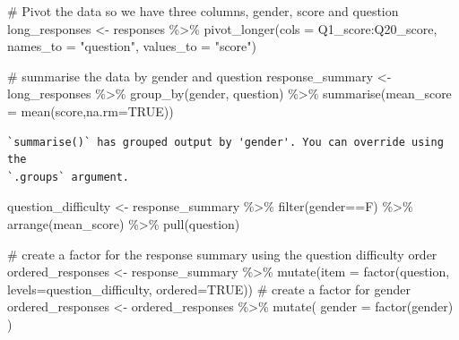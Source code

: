 \documentclass[
  letterpaper,
  DIV=11,
  numbers=noendperiod]{scrreprt}
\newenvironment{Shaded}{\begin{snugshade}}{\end{snugshade}}
\newcommand{\AttributeTok}[1]{\textcolor[rgb]{0.40,0.45,0.13}{#1}}
\newcommand{\CommentTok}[1]{\textcolor[rgb]{0.37,0.37,0.37}{#1}}
\newcommand{\ConstantTok}[1]{\textcolor[rgb]{0.56,0.35,0.01}{#1}}
\newcommand{\FunctionTok}[1]{\textcolor[rgb]{0.28,0.35,0.67}{#1}}
\newcommand{\NormalTok}[1]{\textcolor[rgb]{0.00,0.23,0.31}{#1}}
\newcommand{\OtherTok}[1]{\textcolor[rgb]{0.00,0.23,0.31}{#1}}
\newcommand{\SpecialCharTok}[1]{\textcolor[rgb]{0.37,0.37,0.37}{#1}}
\newcommand{\StringTok}[1]{\textcolor[rgb]{0.13,0.47,0.30}{#1}}
\begin{document}
\begin{Shaded}
\begin{Highlighting}[]
\CommentTok{\# Pivot the data so we have three columns, gender, score and question}
\NormalTok{long\_responses }\OtherTok{\textless{}{-}}\NormalTok{ responses }\SpecialCharTok{\%\textgreater{}\%} \FunctionTok{pivot\_longer}\NormalTok{(}\AttributeTok{cols =}\NormalTok{ Q1\_score}\SpecialCharTok{:}\NormalTok{Q20\_score, }\AttributeTok{names\_to =} \StringTok{"question"}\NormalTok{, }\AttributeTok{values\_to =} \StringTok{"score"}\NormalTok{)}
\end{Highlighting}
\end{Shaded}

\begin{Shaded}
\begin{Highlighting}[]
\CommentTok{\# summarise the data by gender and question}
\NormalTok{response\_summary }\OtherTok{\textless{}{-}}\NormalTok{ long\_responses }\SpecialCharTok{\%\textgreater{}\%} \FunctionTok{group\_by}\NormalTok{(gender, question) }\SpecialCharTok{\%\textgreater{}\%} \FunctionTok{summarise}\NormalTok{(}\AttributeTok{mean\_score =} \FunctionTok{mean}\NormalTok{(score,}\AttributeTok{na.rm=}\ConstantTok{TRUE}\NormalTok{))}
\end{Highlighting}
\end{Shaded}

\begin{verbatim}
`summarise()` has grouped output by 'gender'. You can override using the
`.groups` argument.
\end{verbatim}

\begin{Shaded}
\begin{Highlighting}[]
\NormalTok{question\_difficulty }\OtherTok{\textless{}{-}}\NormalTok{ response\_summary }\SpecialCharTok{\%\textgreater{}\%}
    \FunctionTok{filter}\NormalTok{(gender}\SpecialCharTok{==}\StringTok{\textquotesingle{}F\textquotesingle{}}\NormalTok{) }\SpecialCharTok{\%\textgreater{}\%} 
    \FunctionTok{arrange}\NormalTok{(mean\_score) }\SpecialCharTok{\%\textgreater{}\%} \FunctionTok{pull}\NormalTok{(question)}
\end{Highlighting}
\end{Shaded}

\begin{Shaded}
\begin{Highlighting}[]
\CommentTok{\# create a factor for the response summary using the question difficulty order}
\NormalTok{ordered\_responses }\OtherTok{\textless{}{-}}\NormalTok{ response\_summary }\SpecialCharTok{\%\textgreater{}\%} \FunctionTok{mutate}\NormalTok{(}\AttributeTok{item =} \FunctionTok{factor}\NormalTok{(question, }\AttributeTok{levels=}\NormalTok{question\_difficulty, }\AttributeTok{ordered=}\ConstantTok{TRUE}\NormalTok{))}
\CommentTok{\# create a factor for gender}
\NormalTok{ordered\_responses }\OtherTok{\textless{}{-}}\NormalTok{ ordered\_responses }\SpecialCharTok{\%\textgreater{}\%} \FunctionTok{mutate}\NormalTok{(}
    \AttributeTok{gender =} \FunctionTok{factor}\NormalTok{(gender)}
\NormalTok{)}
\end{Highlighting}
\end{Shaded}
\end{document}
